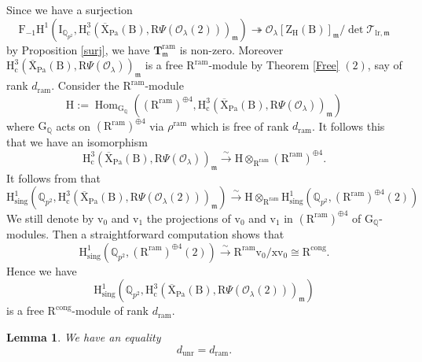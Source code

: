 \documentclass[10pt]{amsart}
\numberwithin{equation}{section}
\newtheorem{lemma}[equation]{Lemma}
\theoremstyle{definition}
\def\lr{\mathrm{lr}}
\def\ram{\mathrm{ram}}
\def\Pa{\mathrm{Pa}}
\def\sing{\mathrm{sing}}
\DeclareMathOperator{\Hom}{Hom}
\def\calO{\mathcal{O}}
\def\calT{\mathcal{T}}
\def\fracm{\mathfrak{m}}
\def\QQ{\mathbb{Q}}
\def\bfT{\mathbf{T}}
\def\rmc{\mathrm{c}}
\def\rmv{\mathrm{v}}
\def\rmx{\mathrm{x}}
\def\rmB{\mathrm{B}}
\def\rmG{\mathrm{G}}
\def\rmH{\mathrm{H}}
\def\rmR{\mathrm{R}}
\def\rmX{\mathrm{X}}
\def\rmZ{\mathrm{Z}}
\def\unr{\mathrm{unr}}
\begin{document}
Since we have a surjection 
\begin{equation*}
\mathrm{F}_{-1}\mathrm{H}^{1}(\mathrm{I}_{\QQ_{p^{2}}}, \mathrm{H}^{3}_{\rmc}(\overline{\rmX}_{\Pa}(\rmB), \rmR\Psi(\calO_{\lambda}(2)))_{\fracm})\twoheadrightarrow 
\calO_{\lambda}[\rmZ_{\rmH}(\rmB)]_{\fracm}/\det\calT_{\lr, \fracm}
\end{equation*}
by Proposition \ref{surj}, we have $\bfT^{\ram}_{\fracm}$ is non-zero.  Moreover $\mathrm{H}^{3}_{\rmc}(\overline{\rmX}_{\Pa}(\rmB), \rmR\Psi(\calO_{\lambda}))_{\fracm}$ is a free $\rmR^{\ram}$-module by Theorem \ref{Free} $(2)$, say of rank $d_{\ram}$. Consider the $\rmR^{\ram}$-module
\begin{equation*}
\rmH:=\Hom_{\rmG_{\QQ}}((\rmR^{\ram})^{\oplus4},\rmH^{3}_{\rmc}(\overline{\rmX}_{\Pa}(\rmB), \rmR\Psi(\calO_{\lambda}))_{\fracm})
\end{equation*}
where $\rmG_{\QQ}$ acts on $(\rmR^{\ram})^{\oplus4}$ via $\rho^{\ram}$ which is free of rank $d_{\ram}$. It follows this that we have an isomorphism
\begin{equation*}
\mathrm{H}^{3}_{\rmc}(\overline{\rmX}_{\Pa}(\rmB), \rmR\Psi(\calO_{\lambda}))_{\fracm}\xrightarrow{\sim}\rmH\otimes_{\rmR^{\ram}}(\rmR^{\ram})^{\oplus4}.
\end{equation*}
It follows from that
\begin{equation*}
\rmH^{1}_{\sing}(\QQ_{p^{2}}, \rmH^{3}_{\rmc}(\overline{\rmX}_{\Pa}(\rmB), \rmR\Psi(\calO_{\lambda}(2)))_{\fracm})\xrightarrow{\sim}\rmH\otimes_{\rmR^{\ram}}\rmH^{1}_{\sing}(\QQ_{p^{2}},(\rmR^{\ram})^{\oplus4}(2))
\end{equation*}
We still denote by $\rmv_{0}$ and $\rmv_{1}$ the projections of $\rmv_{0}$ and $\rmv_{1}$ in $(\rmR^{\ram})^{\oplus4}$ of $\rmG_{\QQ}$-modules. Then a straightforward computation shows that
\begin{equation*}
\rmH^{1}_{\sing}(\QQ_{p^{2}}, (\rmR^{\ram})^{\oplus4}(2))\xrightarrow{\sim} \rmR^{\ram}\rmv_{0}/\rmx\rmv_{0}\cong \rmR^{\mathrm{cong}}. 
\end{equation*}
Hence we have 
\begin{equation*}
\rmH^{1}_{\sing}(\QQ_{p^{2}}, \rmH^{3}_{\rmc}(\overline{\rmX}_{\Pa}(\rmB), \rmR\Psi(\calO_{\lambda}(2)))_{\fracm})
\end{equation*}
is a free $\rmR^{\mathrm{cong}}$-module of rank $d_{\ram}$.
\begin{lemma}
We have an equality 
\begin{equation*}
d_{\unr}=d_{\ram}.
\end{equation*}
\end{lemma}
\end{document}
